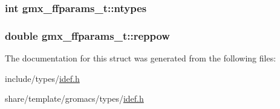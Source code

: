 \hypertarget{structgmx__ffparams__t_a08edf5ff2eda696e11e0c2bcc9b60555}{
\subsubsection[{ntypes}]{\setlength{\rightskip}{0pt plus 5cm}int {\bf gmx\-\_\-ffparams\-\_\-t\-::ntypes}}}\label{structgmx__ffparams__t_a08edf5ff2eda696e11e0c2bcc9b60555}
\hypertarget{structgmx__ffparams__t_aa45b66a436840adc0bb1e7fb21a3a2f0}{
\subsubsection[{reppow}]{\setlength{\rightskip}{0pt plus 5cm}double {\bf gmx\-\_\-ffparams\-\_\-t\-::reppow}}}\label{structgmx__ffparams__t_aa45b66a436840adc0bb1e7fb21a3a2f0}


\-The documentation for this struct was generated from the following files\-:\begin{DoxyCompactItemize}
\item 
include/types/\hyperlink{include_2types_2idef_8h}{idef.\-h}\item 
share/template/gromacs/types/\hyperlink{share_2template_2gromacs_2types_2idef_8h}{idef.\-h}\end{DoxyCompactItemize}

